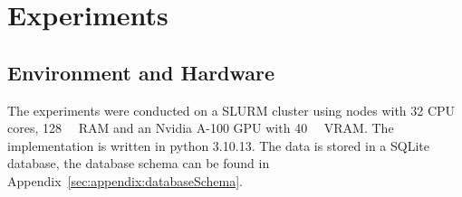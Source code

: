 \chapter{Experiments}
\label{sec:experiments}


\section{Environment and Hardware}
\label{sec:experiments:environmentHardware}
The experiments were conducted on a SLURM cluster using nodes with \num{32} CPU cores, \SI{128}{\giga\byte} RAM and an Nvidia A-100 GPU with \SI{40}{\giga\byte} VRAM. The implementation is written in python 3.10.13. The data is stored in a SQLite database, the database schema can be found in Appendix~\ref{sec:appendix:databaseSchema}.






